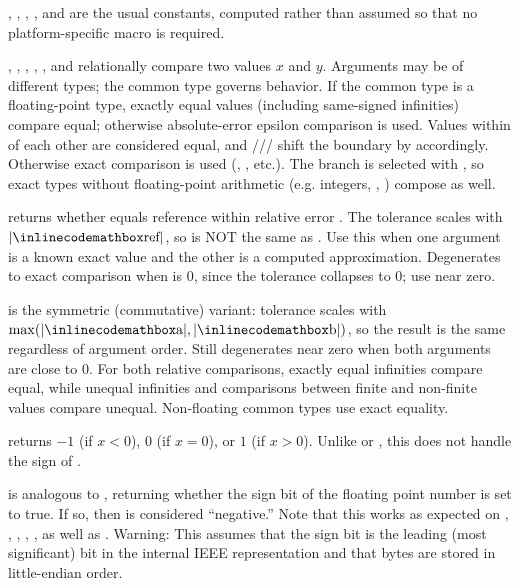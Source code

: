 \begin{compactitem}
  \item {}, , , , and  are the usual constants, computed rather than assumed so that no platform-specific macro is required.
  \item {}, , , , , and  relationally compare two values $x$ and $y$. Arguments may be of different types; the common type governs behavior. If the common type is a floating-point type, exactly equal values (including same-signed infinities) compare equal; otherwise absolute-error epsilon comparison is used. Values within  of each other are considered equal, and /// shift the boundary by  accordingly. Otherwise exact comparison is used (\inlinecode{==}, \inlinecode{\textless{}}, etc.). The branch is selected with , so exact types without floating-point arithmetic (e.g. integers, , ) compose as well.
  \item {} returns whether  equals reference  within relative error . The tolerance scales with $|{\inlinecodemath{ref}}|$, so  is NOT the same as . Use this when one argument is a known exact value and the other is a computed approximation. Degenerates to exact comparison when  is $0$, since the tolerance collapses to $0$; use  near zero.
  \item {} is the symmetric (commutative) variant: tolerance scales with $\max(|{\inlinecodemath{a}}|, |{\inlinecodemath{b}}|)$, so the result is the same regardless of argument order. Still degenerates near zero when both arguments are close to $0$. For both relative comparisons, exactly equal infinities compare equal, while unequal infinities and comparisons between finite and non-finite values compare unequal. Non-floating common types use exact equality.
  \item {} returns $-1$ (if $x < 0$), $0$ (if $x = 0$), or $1$ (if $x > 0$). Unlike  or , this does not handle the sign of .
  \item {} is analogous to , returning whether the sign bit of the floating point number is set to true. If so, then  is considered ``negative.'' Note that this works as expected on , , , , , as well as . Warning: This assumes that the sign bit is the leading (most significant) bit in the internal IEEE representation and that bytes are stored in little-endian order.

\end{compactitem}
